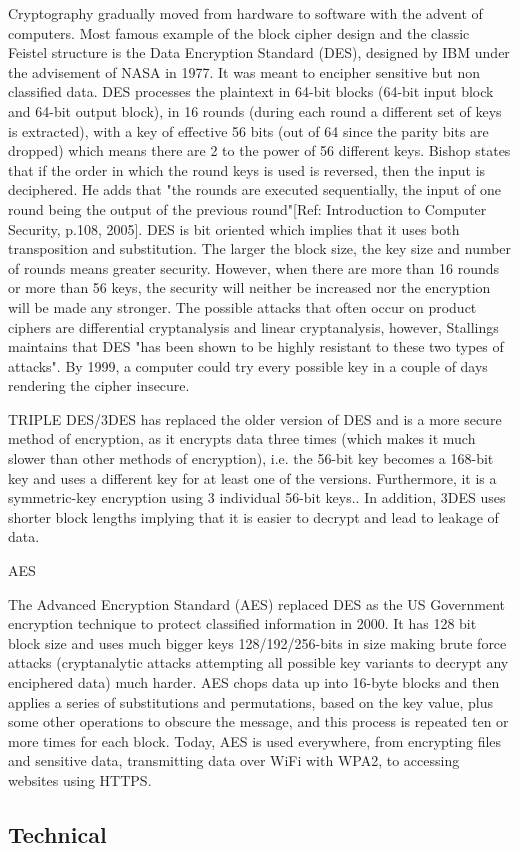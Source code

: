 Cryptography gradually moved from hardware to software with the advent of computers. Most famous example of the block cipher design and the classic Feistel structure is the Data Encryption Standard (DES), designed by IBM under the advisement of NASA in 1977. It was meant to encipher sensitive but non classified data. DES processes the plaintext in 64-bit blocks (64-bit input block and 64-bit output block), in 16 rounds (during each round  a different set of keys is extracted), with a key of effective 56 bits (out of 64 since the parity bits are dropped) which means there are 2 to the power of 56 different keys. Bishop states that if the order in which the round keys is used is reversed, then the input is deciphered. He adds that "the rounds are executed sequentially, the input of one round being the output of the previous round"[Ref: Introduction to Computer Security, p.108, 2005]. DES is bit oriented which implies that it uses both transposition and substitution. The larger the block size, the key size and number of rounds means greater security. However, when there are more than 16 rounds or more than 56 keys, the security will neither be increased nor the encryption will be made any stronger. The possible attacks that often occur on product ciphers are differential cryptanalysis and linear cryptanalysis, however, Stallings maintains that DES "has been shown to be highly resistant to these two types of attacks". By 1999, a computer could try every possible key in a couple of days rendering the cipher insecure.

TRIPLE DES/3DES has replaced the older version of DES and is a more secure method of encryption, as it encrypts data three times (which makes it much slower than other methods of encryption), i.e. the 56-bit key becomes a 168-bit key and uses a different key for at least one of the versions. Furthermore,  it is a symmetric-key encryption using 3 individual 56-bit keys.. In addition, 3DES uses shorter block lengths implying  that it is easier to decrypt and lead to leakage of data.

AES

The Advanced Encryption Standard (AES) replaced DES as the US Government encryption technique to protect classified information  in 2000. It has 128 bit block size and uses much bigger keys 128/192/256-bits in size making brute force attacks (cryptanalytic attacks attempting all possible key variants to decrypt any enciphered data) much harder. AES chops data up into 16-byte blocks and then applies a series of substitutions and permutations, based on the key value, plus some other operations to obscure the message, and this process is repeated ten or more times for each block. Today, AES is used everywhere, from encrypting files and sensitive data, transmitting data over WiFi with WPA2, to accessing websites using HTTPS. 

\subsection{Technical}

